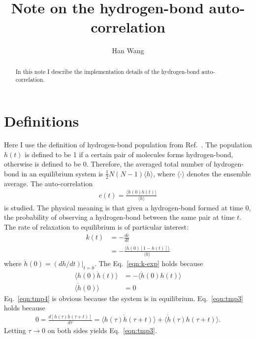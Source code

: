 \documentclass[unsortedaddress,a4paper,onecolumn]{revtex4}
\begin{document}
\title{Note on the hydrogen-bond auto-correlation}
\author{Han Wang}
   
\begin{abstract}
  In this note I describe the implementation details of the hydrogen-bond auto-correlation.
\end{abstract}

\maketitle

\section{Definitions}
Here I use the definition of hydrogen-bond population from
Ref.~\cite{luzar1996effect, luzar1996hydrogen}.  The population $h(t)$
is defined to be 1 if a certain pair of molecules forms hydrogen-bond,
otherwise is defined to be 0. Therefore, the averaged total number of
hydrogen-bond in an equilibrium system is $\frac12 N(N-1)\langle
h\rangle$, where $\langle\cdot\rangle$ denotes the ensemble average.
The auto-correlation
\begin{align}
  c(t) = \frac{\langle h(0) h(t)\rangle}{\langle h\rangle}
\end{align}
is studied. The physical meaning is that given a hydrogen-bond formed
at time $0$, the probability of observing a hydrogen-bond between the
same pair at time $t$.
The rate of relaxation to equilibrium is of particular interest:
\begin{align}\label{eqn:k-def}
  k(t) &= -\frac{dc}{dt}\\\label{eqn:k-exp}
  &= -\frac{\langle \dot h(0) [1 - h(t)] \rangle}{\langle h\rangle}
\end{align}
where $\dot h(0) = (dh/dt)\vert_{t=0}$. The Eq.~\eqref{eqn:k-exp} holds because
\begin{align} \label{eqn:tmp3}
  \langle h(0) \dot h(t) \rangle &= - \langle \dot h(0) h(t)\rangle \\\label{eqn:tmp4}
  \langle \dot h(0) \rangle &= 0
\end{align}
Eq.~\eqref{eqn:tmp4} is obvious because the system is in equilibrium. Eq.~\eqref{eqn:tmp3} holds because
\begin{align}
  0 = \frac{d [ h(\tau) h(\tau+t) ] }{d\tau} =  \langle h(\tau) \dot h(\tau+t)\rangle  + \langle \dot h(\tau) h(\tau+t)\rangle.
\end{align}
Letting $\tau \rightarrow 0$ on both sides yields Eq.~\eqref{eqn:tmp3}.
\end{document}
